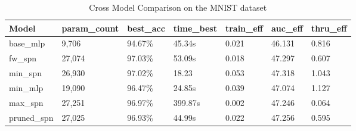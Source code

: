 \begin{table}[h!]
    \centering
    \begin{tabular}{|l|l|l|l|l|l|l|}
    \hline
    \textbf{Model} & \textbf{param\_count} & \textbf{best\_acc} & \textbf{time\_best} & \textbf{train\_eff} & \textbf{auc\_eff} & \textbf{thru\_eff} \\
    \hline
    base\_mlp & 9,706 & \cellcolor{red!25}94.67\% & 45.34s & 0.021 & \cellcolor{red!25}46.131 & 0.816 \\
    fw\_spn & 27,074  & \cellcolor{green!25}97.03\% & 53.09s  & 0.018 & 47.297 & 0.607 \\
    min\_spn & 26,930 & 97.02\% & \cellcolor{green!25}18.23  & \cellcolor{green!25}0.053 & \cellcolor{green!25}47.318 & 1.043 \\
    min\_mlp & 19,090 & 96.47\% & 24.85s & 0.039 & 47.074 & \cellcolor{green!25}1.127 \\
    max\_spn & 27,251  & 96.97\% & \cellcolor{red!25}399.87s & \cellcolor{red!25}0.002 & 47.246 & \cellcolor{red!25}0.064 \\
    pruned\_spn & 27,025 & 96.93\% & 44.99s & 0.022 & 47.256 & 0.595 \\
    \hline
    \end{tabular}
    \caption{Cross Model Comparison on the MNIST dataset}
    \label{tab:mnistResults}
\end{table}


